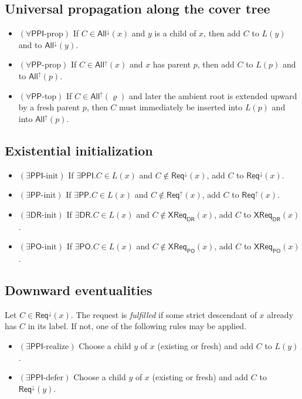 \documentclass[11pt]{article}
\theoremstyle{remark}
\newcommand{\DR}{\mathsf{DR}}
\newcommand{\PO}{\mathsf{PO}}
\newcommand{\PP}{\mathsf{PP}}
\newcommand{\PPI}{\mathsf{PPI}}
\newcommand{\ReqUp}{\mathsf{Req}^{\uparrow}}
\newcommand{\ReqDown}{\mathsf{Req}^{\downarrow}}
\newcommand{\AllUp}{\mathsf{All}^{\uparrow}}
\newcommand{\AllDown}{\mathsf{All}^{\downarrow}}
\newcommand{\CrossDR}{\mathsf{XReq}_{\DR}}
\newcommand{\CrossPO}{\mathsf{XReq}_{\PO}}
\begin{document}
\subsection{Universal propagation along the cover tree}

\begin{itemize}
    \item $(\forall\PPI\text{-prop})$ If $C\in \AllDown(x)$ and $y$ is a child of $x$, then add $C$ to $L(y)$ and to $\AllDown(y)$.
    \item $(\forall\PP\text{-prop})$ If $C\in \AllUp(x)$ and $x$ has parent $p$, then add $C$ to $L(p)$ and to $\AllUp(p)$.
    \item $(\forall\PP\text{-top})$ If $C\in \AllUp(\varrho)$ and later the ambient root is extended upward by a fresh parent $p$, then $C$ must immediately be inserted into $L(p)$ and into $\AllUp(p)$.
\end{itemize}

\subsection{Existential initialization}

\begin{itemize}
    \item $(\exists\PPI\text{-init})$ If $\exists\PPI.C\in L(x)$ and $C\notin \ReqDown(x)$, add $C$ to $\ReqDown(x)$.
    \item $(\exists\PP\text{-init})$ If $\exists\PP.C\in L(x)$ and $C\notin \ReqUp(x)$, add $C$ to $\ReqUp(x)$.
    \item $(\exists\DR\text{-init})$ If $\exists\DR.C\in L(x)$ and $C\notin \CrossDR(x)$, add $C$ to $\CrossDR(x)$.
    \item $(\exists\PO\text{-init})$ If $\exists\PO.C\in L(x)$ and $C\notin \CrossPO(x)$, add $C$ to $\CrossPO(x)$.
\end{itemize}

\subsection{Downward eventualities}

Let $C\in \ReqDown(x)$. The request is \emph{fulfilled} if some strict descendant of $x$ already has $C$ in its label. If not, one of the following rules may be applied.

\begin{itemize}
    \item $(\exists\PPI\text{-realize})$ Choose a child $y$ of $x$ (existing or fresh) and add $C$ to $L(y)$.
    \item $(\exists\PPI\text{-defer})$ Choose a child $y$ of $x$ (existing or fresh) and add $C$ to $\ReqDown(y)$.
\end{itemize}
\end{document}
